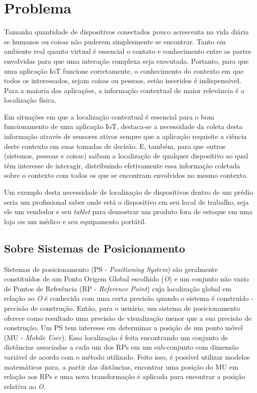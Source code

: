 \section{Problema}
\label{sec:Problema}

Tamanha quantidade de dispositivos conectados pouco acrescenta na vida diária se
humanos ou coisas não puderem simplesmente se encontrar. Tanto em ambiente real
quanto virtual é essencial o contato e conhecimento entre as partes envolvidas
para que uma interação complexa seja executada. Portanto, para que uma aplicação
IoT funcione corretamente, o conhecimento do contexto em que todos os
interessados, sejam coisas ou pessoas, estão inseridos é indispensável. Para a
maioria das aplicações, a informação contextual de maior relevância é a
localização física.

Em situações em que a localização contextual é essencial para o bom funcionamento
de uma aplicação IoT, destaca-se a necessidade da coleta desta informação através
de sensores ativos sempre que a aplicação requisite a ciência deste contexto
em suas tomadas de decisão. E, também, para que outros (sistemas, pessoas e coisas)
saibam a localização de qualquer dispositivo ao qual têm interesse de interagir,
distribuindo efetivamente essa informação coletada sobre o contexto com todos os
que se encontram envolvidos no mesmo contexto.

Um exemplo desta necessidade de localização de dispositivos dentro de um prédio
seria um profissional saber onde está o dispositivo em seu local de trabalho,
seja ele um vendedor e seu \emph{tablet} para demostrar um produto fora de
estoque em uma loja ou um médico e seu equipamento portátil.

\subsection{Sobre Sistemas de Posicionamento}
\label{subsec:Sobre Sistemas de Posicionamento}

Sistemas de posicionamento (PS - \emph{Positioning System}) são geralmente
constituídos de um Ponto Origem Global escolhido (\emph{O}) e um conjunto não
vazio de Pontos de Referência (RP - \emph{Reference Point}) cuja localização
global em relação ao \emph{O} é conhecida com uma certa precisão quando o sistema
é construído - precisão de construção. Então, para o usuário, um sistema de posicionamento
oferece como resultado uma precisão de visualização menor que a sua precisão de construção.
Um PS tem interesse em determinar a posição de um ponto móvel (MU - \emph{Mobile User}).
Essa localização é feita encontrando um conjunto de distâncias associadas a cada um dos RPs em um
sub-conjunto com dimensão variável de acordo com o método utilizado. Feito isso, é
possível utilizar modelos matemáticos para, a partir das distâncias, encontrar
uma posição do MU em relação aos RPs e uma nova transformação é aplicada para
encontrar a posição relativa ao \emph{O}.

